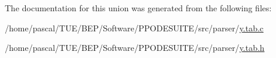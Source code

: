 The documentation for this union was generated from the following files\-:\begin{DoxyCompactItemize}
\item 
/home/pascal/\-T\-U\-E/\-B\-E\-P/\-Software/\-P\-P\-O\-D\-E\-S\-U\-I\-T\-E/src/parser/\hyperlink{y_8tab_8c}{y.\-tab.\-c}\item 
/home/pascal/\-T\-U\-E/\-B\-E\-P/\-Software/\-P\-P\-O\-D\-E\-S\-U\-I\-T\-E/src/parser/\hyperlink{y_8tab_8h}{y.\-tab.\-h}\end{DoxyCompactItemize}
